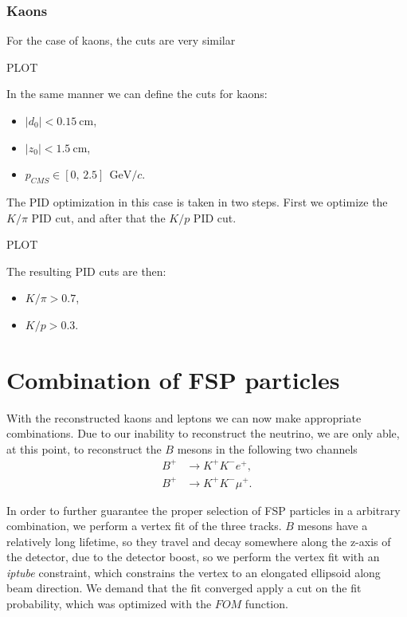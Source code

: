 \documentclass[oneside,a4paper,openany,12pt]{scrbook}
\newcommand {\e}[1]{\mathrm{~#1}}
\begin{document}
\subsubsection{Kaons}

For the case of kaons, the cuts are very similar

\begin{center}
PLOT
\end{center}

In the same manner we can define the cuts for kaons:
\begin{itemize}
\item $\vert d_0 \vert < 0.15\e{cm}$,
\item $\vert z_0 \vert < 1.5\e{cm}$,
\item $p_{CMS} \in [0,\,2.5]~\e{GeV}/c$.
\end{itemize}

The PID optimization in this case is taken in two steps. First we optimize the $K / \pi$ PID cut, and after that the $K/p$ PID cut.

\begin{center}
PLOT
\end{center}

The resulting PID cuts are then:
\begin{itemize}
\item $K/\pi > 0.7$,
\item $K/p > 0.3$.
\end{itemize}

\section{Combination of FSP particles}

With the reconstructed kaons and leptons we can now make appropriate combinations. Due to our inability to reconstruct the neutrino, we are only able, at this point, to reconstruct the $B$ mesons in the following two channels
\begin{align*}
B^+ &\to K^+ K^- e^+, \\
B^+ &\to K^+ K^- \mu^+.
\end{align*}

In order to further guarantee the proper selection of FSP particles in a arbitrary combination, we perform a vertex fit of the three tracks. $B$ mesons have a relatively long lifetime, so they travel and decay somewhere along the z-axis of the detector, due to the detector boost, so we perform the vertex fit with an \textit{iptube} constraint, which constrains the vertex to an elongated ellipsoid along beam direction. We demand that the fit converged apply a cut on the fit probability, which was optimized with the $FOM$ function.
\end{document}
